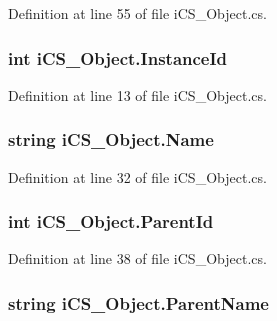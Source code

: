 Definition at line 55 of file i\+C\+S\+\_\+\+Object.\+cs.

\hypertarget{classi_c_s___object_a005c8976febb3833ff3316c7e3be0bd0}{
\subsubsection[{Instance\+Id}]{\setlength{\rightskip}{0pt plus 5cm}int i\+C\+S\+\_\+\+Object.\+Instance\+Id\hspace{0.3cm}{\ttfamily [get]}}}\label{classi_c_s___object_a005c8976febb3833ff3316c7e3be0bd0}


Definition at line 13 of file i\+C\+S\+\_\+\+Object.\+cs.

\hypertarget{classi_c_s___object_a12fdab7b8a06cc20573eee44e8dc52be}{
\subsubsection[{Name}]{\setlength{\rightskip}{0pt plus 5cm}string i\+C\+S\+\_\+\+Object.\+Name\hspace{0.3cm}{\ttfamily [get]}}}\label{classi_c_s___object_a12fdab7b8a06cc20573eee44e8dc52be}


Definition at line 32 of file i\+C\+S\+\_\+\+Object.\+cs.

\hypertarget{classi_c_s___object_a41a1200a1e5cdabe2645ff0778b2d6e2}{
\subsubsection[{Parent\+Id}]{\setlength{\rightskip}{0pt plus 5cm}int i\+C\+S\+\_\+\+Object.\+Parent\+Id\hspace{0.3cm}{\ttfamily [get]}}}\label{classi_c_s___object_a41a1200a1e5cdabe2645ff0778b2d6e2}


Definition at line 38 of file i\+C\+S\+\_\+\+Object.\+cs.

\hypertarget{classi_c_s___object_a002230a69293573dca420fd77f233203}{
\subsubsection[{Parent\+Name}]{\setlength{\rightskip}{0pt plus 5cm}string i\+C\+S\+\_\+\+Object.\+Parent\+Name\hspace{0.3cm}{\ttfamily [get]}}}\label{classi_c_s___object_a002230a69293573dca420fd77f233203}


